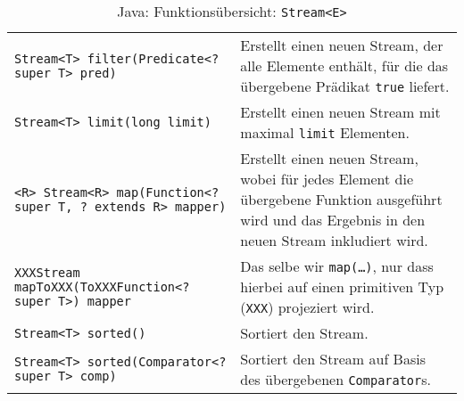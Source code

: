 \begin{sidewaystable}
\begin{tabular}{p{8cm} | p{13cm}}
					\texttt{Stream<T> filter(Predicate<? super T> pred)}                                             & Erstellt einen neuen Stream, der alle Elemente enthält, für die das übergebene Prädikat \texttt{true} liefert.                                                                                                \\
					\texttt{Stream<T> limit(long limit)}                                                             & Erstellt einen neuen Stream mit maximal \texttt{limit} Elementen.                                                                                                                                             \\
					\texttt{<R> Stream<R> map(Function<? super T, ? extends R> mapper)}                              & Erstellt einen neuen Stream, wobei für jedes Element die übergebene Funktion ausgeführt wird und das Ergebnis in den neuen Stream inkludiert wird.                                                            \\
					\texttt{XXXStream mapToXXX(ToXXXFunction<? super T>) mapper}                                     & Das selbe wir \texttt{map(\dots)}, nur dass hierbei auf einen primitiven Typ (\texttt{XXX}) projeziert wird.                                                                                                  \\
					\texttt{Stream<T> sorted()}                                                                      & Sortiert den Stream.                                                                                                                                                                                          \\
					\texttt{Stream<T> sorted(Comparator<? super T> comp)}                                            & Sortiert den Stream auf Basis des übergebenen \texttt{Comparator}s.                                                                                                                                           \\
				\end{tabular}
				\caption{Java: Funktionsübersicht: \texttt{Stream<E>}}
			\end{sidewaystable}


